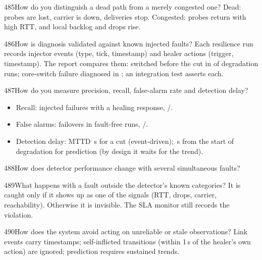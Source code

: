 \begin{qa}{485}{How do you distinguish a dead path from a merely congested one?}
Dead: probes are lost, carrier is down, deliveries stop. Congested: probes return with high RTT, and local backlog and
drops rise.
\end{qa}

\begin{qa}{486}{How is diagnosis validated against known injected faults?}
Each resilience run records injector events (type, tick, timestamp) and healer actions (trigger, timestamp). The
report compares them: switched before the cut in \NDegBeforeCutShare{} of degradation runs; core-switch failure
diagnosed in \NCoreDiagnosedShare{}; an integration test asserts each.
\end{qa}

\begin{qa}{487}{How do you measure precision, recall, false-alarm rate and detection delay?}
\begin{itemize}
\item Recall: injected failures with a healing response, \NInjectedDetected/\NInjectedRuns.
\item False alarms: failovers in fault-free runs, \NFalseFailoverRuns/\NNoFaultRuns.
\item Detection delay: MTTD \NMttdCutFull\,s for a cut (event-driven); \NMttdDegFull\,s from the start of degradation
for prediction (by design it waits for the trend).
\end{itemize}
\end{qa}

\begin{qa}{488}{How does detector performance change with several simultaneous faults?}
\end{qa}

\begin{qa}{489}{What happens with a fault outside the detector's known categories?}
It is caught only if it shows up as one of the signals (RTT, drops, carrier, reachability). Otherwise it is
invisible. The SLA monitor still records the violation.
\end{qa}

\begin{qa}{490}{How does the system avoid acting on unreliable or stale observations?}
Link events carry timestamps; self-inflicted transitions (within 1\,s of the healer's own action) are ignored;
prediction requires sustained trends.
\end{qa}

